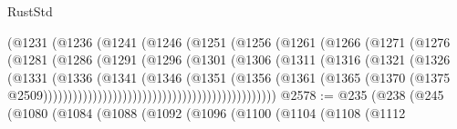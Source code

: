 \begin{lexlean}{RustStd}
\begin{coremodule}
                                      (@1231
                                        (@1236
                                          (@1241
                                            (@1246
                                              (@1251
                                                (@1256
                                                  (@1261
                                                    (@1266
                                                      (@1271
                                                        (@1276
                                                          (@1281
                                                            (@1286
                                                              (@1291
                                                                (@1296
                                                                  (@1301
                                                                    (@1306
                                                                      (@1311
                                                                        (@1316
                                                                          (@1321
                                                                            (@1326
                                                                              (@1331
                                                                                (@1336
                                                                                  (@1341
                                                                                    (@1346
                                                                                      (@1351
                                                                                        (@1356
                                                                                          (@1361
                                                                                            (@1365
                                                                                              (@1370
                                                                                                (@1375
                                                                                                  @2509)))))))))))))))))))))))))))))))))))))))))))))))
@2578 := @235
    (@238
      (@245
        (@1080
          (@1084
            (@1088
              (@1092
                (@1096
                  (@1100
                    (@1104
                      (@1108
                        (@1112

\end{coremodule}
\end{lexlean}
